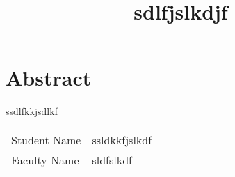 \documentclass{article}
\begin{document}
    \title{\textbf{sdlfjslkdjf}}
    \author{}
    \date{}

    \maketitle

    \section*{Abstract}
    ssdlfkkjsdlkf

    \vspace{10pt}

    \begin{tabular}{|l|l|}
    \hline
    Student Name & ssldkkfjslkdf \\
    Faculty Name & sldfslkdf \\
    \hline
    \end{tabular}

    
\end{document}
